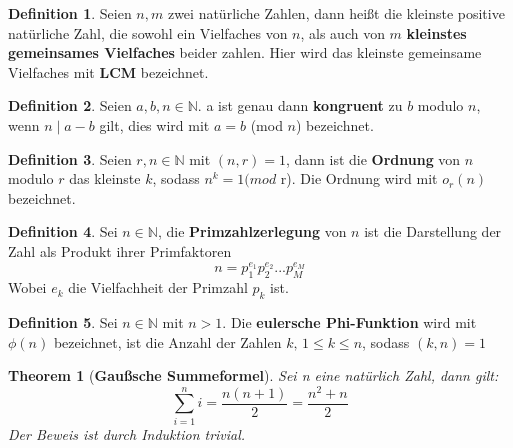 \documentclass[12pt,oneside]{article}
\newtheorem{theorem}{Theorem}[section]
\theoremstyle{remark}
\theoremstyle{definition}
\newtheorem{definition}{Definition}[section]
\begin{document}
\smallskip

\begin{definition}
Seien $n, m$ zwei natürliche Zahlen, dann heißt die kleinste positive natürliche Zahl, die sowohl ein Vielfaches von $n$, als auch von $m$ \textbf{kleinstes gemeinsames Vielfaches} beider zahlen. Hier wird das kleinste gemeinsame Vielfaches mit \textbf{LCM} bezeichnet.
\end{definition}

\smallskip 

\begin{definition}\label{Df_3}
Seien $a, b, n \in \mathbb{N}$. a ist genau dann \textbf{kongruent} zu $b$ modulo $n$, wenn $n \mid a - b $ gilt, dies wird mit $a = b$ (mod $n$) bezeichnet.  
\end{definition}

\smallskip 

\begin{definition}\label{Df_4}
Seien $r,n \in \mathbb{N}$ mit $(n,r) = 1$, dann ist die \textbf{Ordnung} von $n$ modulo $r$ das kleinste $k$, sodass $n^k = 1 (mod $ r). Die Ordnung wird mit $o_{r}(n)$ bezeichnet.
\end{definition}

\smallskip


\begin{definition}\label{Df_5}
Sei $n \in \mathbb{N}$, die \textbf{Primzahlzerlegung} von $n$ ist die Darstellung der Zahl als Produkt ihrer Primfaktoren \newline
\begin{equation}
    n = p_{1}^{e_{1}}p_{2}^{e_{2}}...p_{M}^{e_{M}}
\end{equation}
Wobei $e_{k}$ die Vielfachheit der Primzahl $p_{k}$ ist.
\end{definition}

\smallskip


\begin{definition}\label{Df_6}
Sei $n \in \mathbb{N}$ mit $n > 1$. Die \textbf{eulersche Phi-Funktion} wird mit $\phi(n)$ bezeichnet, ist die Anzahl der Zahlen $k, \, 1 \leq k \leq n$, sodass $(k,n) = 1$
\end{definition}

\smallskip

\begin{theorem}[\textbf{Gaußsche Summeformel}]\label{gauss}
Sei n eine natürlich Zahl, dann gilt:
\begin{equation}
    \sum_{i = 1}^{n} i = \frac{n (n + 1)}{2} = \frac{n^2 + n}{2} 
\end{equation}
Der Beweis ist durch Induktion trivial. 
\end{theorem}
\end{document}
